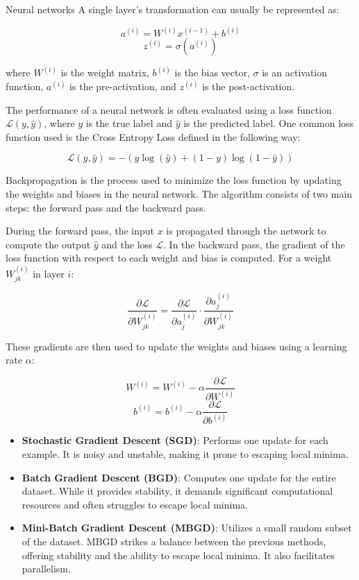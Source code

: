 \documentclass{beamer}
\begin{document}
\begin{frame}
\begin{columns}
\begin{column}{0.3\textwidth}
\begin{block}{Neural networks}
A single layer's transformation can usually be represented as:

\[
a^{(i)} = W^{(i)} x^{(i-1)} + b^{(i)}
\]
\[
z^{(i)} = \sigma(a^{(i)})
\]

where \( W^{(i)} \) is the weight matrix, \( b^{(i)} \) is the bias vector, \( \sigma \) is an activation function, \( a^{(i)} \) is the pre-activation, and \( z^{(i)} \) is the post-activation.

The performance of a neural network is often evaluated using a loss function \( \mathcal{L}(y, \hat{y}) \), where \( y \) is the true label and \( \hat{y} \) is the predicted label. One common loss function used is the Cross Entropy Loss defined in the following way:

\[
\mathcal{L}(y, \hat{y}) = -\left( y \log(\hat{y}) + (1 - y) \log(1 - \hat{y}) \right)
\]

Backpropagation is the process used to minimize the loss function by updating the weights and biases in the neural network. The algorithm consists of two main steps: the forward pass and the backward pass.

During the forward pass, the input \( x \) is propagated through the network to compute the output \( \hat{y} \) and the loss \( \mathcal{L} \). In the backward pass, the gradient of the loss function with respect to each weight and bias is computed. For a weight \( W_{jk}^{(i)} \) in layer \( i \):

\[
\frac{\partial \mathcal{L}}{\partial W_{jk}^{(i)}} = \frac{\partial \mathcal{L}}{\partial a_j^{(i)}} \cdot \frac{\partial a_j^{(i)}}{\partial W_{jk}^{(i)}}
\]

These gradients are then used to update the weights and biases using a learning rate \( \alpha \):

\[
W^{(i)} = W^{(i)} - \alpha \frac{\partial \mathcal{L}}{\partial W^{(i)}}
\]
\[
b^{(i)} = b^{(i)} - \alpha \frac{\partial \mathcal{L}}{\partial b^{(i)}}
\]

\begin{itemize}
    \item \textbf{Stochastic Gradient Descent (SGD)}: Performs one update for each example. It is noisy and unstable, making it prone to escaping local minima.
    \item \textbf{Batch Gradient Descent (BGD)}: Computes one update for the entire dataset. While it provides stability, it demands significant computational resources and often struggles to escape local minima.
    \item \textbf{Mini-Batch Gradient Descent (MBGD)}: Utilizes a small random subset of the dataset. MBGD strikes a balance between the previous methods, offering stability and the ability to escape local minima. It also facilitates parallelism.
\end{itemize}

\end{block} 

\end{column}

\end{columns}

\end{frame}
\end{document}
